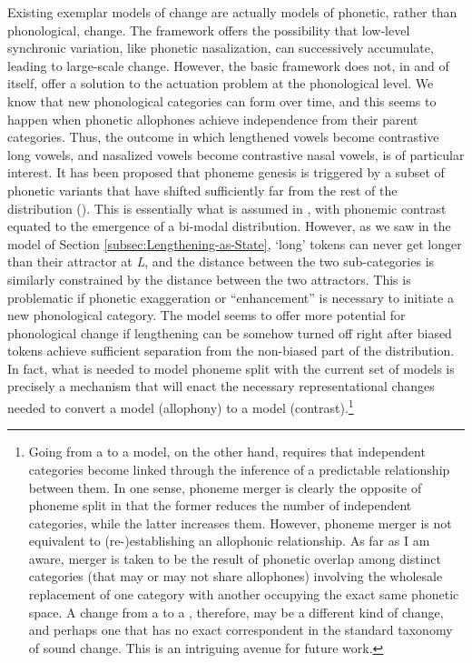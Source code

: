 Existing exemplar models of change are actually models of phonetic,
rather than phonological, change. The framework offers the possibility
that low-level synchronic variation, like phonetic nasalization, can
successively accumulate, leading to large-scale change. However, the
basic framework does not, in and of itself, offer a solution to the
actuation problem at the phonological level. We know that new phonological
categories can form over time, and this seems to happen when phonetic
allophones achieve independence from their parent categories. Thus,
the outcome in which lengthened vowels become contrastive long vowels,
and nasalized vowels become contrastive nasal vowels, is of particular
interest. It has been proposed that phoneme genesis is triggered by
a subset of phonetic variants that have shifted sufficiently far from
the rest of the distribution (\citealt{Janda2003,Janda2008}). This
is essentially what is assumed in \citet{Wedel2008}, with phonemic
contrast equated to the emergence of a bi-modal distribution. However,
as we saw in the  model of Section \ref{subsec:Lengthening-as-State},
`long' tokens can never get longer than their attractor at \emph{L},
and the distance between the two sub-categories is similarly constrained
by the distance between the two attractors. This is problematic if
phonetic exaggeration or “enhancement” is necessary to initiate
a new phonological category. The  model seems to offer
more potential for phonological change if lengthening can be somehow
turned off right after biased tokens achieve sufficient separation
from the non-biased part of the distribution. In fact, what is needed
to model phoneme split with the current set of models is precisely
a mechanism that will enact the necessary representational changes
needed to convert a  model (allophony) to a 
model (contrast).\footnote{Going from a  to a  model, on the other
hand, requires that independent categories become linked through the
inference of a predictable relationship between them. In one sense,
phoneme merger is clearly the opposite of phoneme split in that the
former reduces the number of independent categories, while the latter
increases them. However, phoneme merger is not equivalent to (re-)establishing
an allophonic relationship. As far as I am aware, merger is taken
to be the result of phonetic overlap among distinct categories (that
may or may not share allophones) involving the wholesale replacement
of one category with another occupying the exact same phonetic space.
A change from a  to a , therefore, may be
a different kind of change, and perhaps one that has no exact correspondent
in the standard taxonomy of sound change. This is an intriguing avenue
for future work.}

